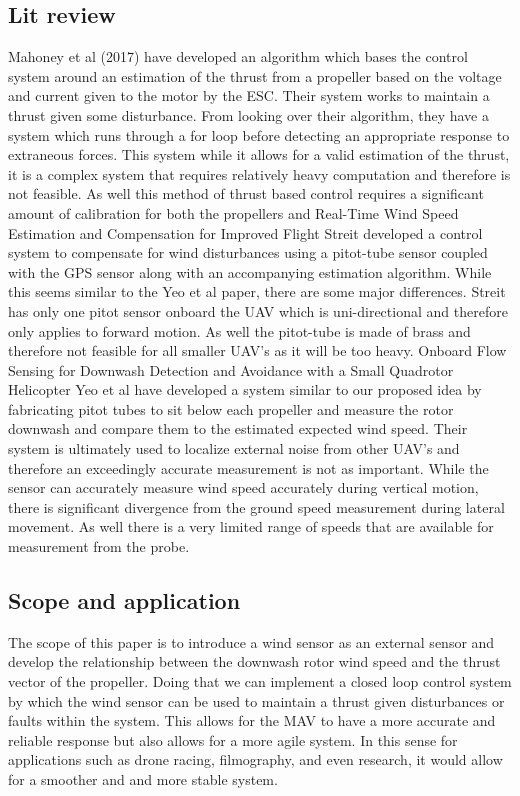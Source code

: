 \documentclass[conference]{IEEEtran}
\begin{document}
	\subsection{Lit review}
	Mahoney et al (2017) have developed an algorithm which bases the control system around an estimation of the thrust from a propeller based on the voltage and current given to the motor by the ESC. Their system works to maintain a thrust given some disturbance. From looking over their algorithm, they have a system which runs through a for loop before detecting an appropriate response to extraneous forces. This system while it allows for a valid estimation of the thrust, it is a complex system that requires relatively heavy computation and therefore is not feasible. As well this method of thrust based control requires a significant amount of calibration for both the propellers and 
	Real-Time Wind Speed Estimation and Compensation for Improved Flight
	Streit developed a control system to compensate for wind disturbances using a pitot-tube sensor coupled with the GPS sensor along with an accompanying estimation algorithm. While this seems similar to the Yeo et al paper, there are some major differences. Streit has only one pitot sensor onboard the UAV which is uni-directional and therefore only applies to forward motion. As well the pitot-tube is made of brass and therefore not feasible for all smaller UAV's as it will be too heavy. 
	Onboard Flow Sensing for Downwash Detection and Avoidance with a Small Quadrotor Helicopter
	Yeo et al have developed a system similar to our proposed idea by fabricating pitot tubes to sit below each propeller and measure the rotor downwash and compare them to the estimated expected wind speed. Their system is ultimately used to localize external noise from other UAV's and therefore an exceedingly accurate measurement is not as important. While the sensor can accurately measure wind speed accurately during vertical motion, there is significant divergence from the ground speed measurement during lateral movement. As well there is a very limited range of speeds that are available for measurement from the probe. 
	\subsection{Scope and application}
	The scope of this paper is to introduce a wind sensor as an external sensor and develop the relationship between the downwash rotor wind speed and the thrust vector of the propeller. Doing that we can implement a closed loop control system by which the wind sensor can be used to maintain a thrust given disturbances or faults within the system. This allows for the MAV to have a more accurate and reliable response but also allows for a more agile system. In this sense for applications such as drone racing, filmography, and even research, it would allow for a smoother and and more stable system. 
\end{document}

